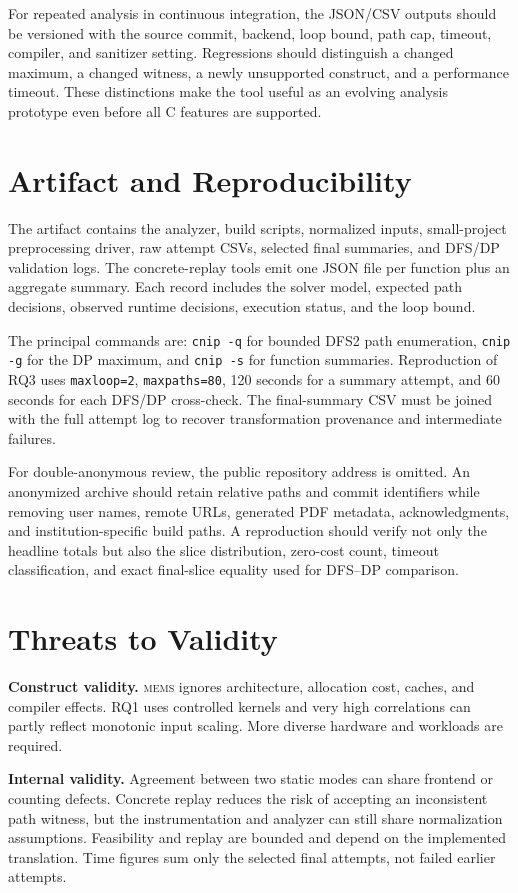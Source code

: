\documentclass[10pt,conference]{IEEEtran}
\newcommand{\mems}{\textsc{mems}\xspace}
\newcommand{\code}[1]{\texttt{#1}}
\begin{document}
For repeated analysis in continuous integration, the JSON/CSV outputs should be versioned with the source commit, backend, loop bound, path cap, timeout, compiler, and sanitizer setting. Regressions should distinguish a changed maximum, a changed witness, a newly unsupported construct, and a performance timeout. These distinctions make the tool useful as an evolving analysis prototype even before all C features are supported.

\section{Artifact and Reproducibility}
The artifact contains the analyzer, build scripts, normalized inputs, small-project preprocessing driver, raw attempt CSVs, selected final summaries, and DFS/DP validation logs. The concrete-replay tools emit one JSON file per function plus an aggregate summary. Each record includes the solver model, expected path decisions, observed runtime decisions, execution status, and the loop bound.

The principal commands are: \code{cnip -q} for bounded DFS2 path enumeration, \code{cnip -g} for the DP maximum, and \code{cnip -s} for function summaries. Reproduction of RQ3 uses \code{maxloop=2}, \code{maxpaths=80}, 120 seconds for a summary attempt, and 60 seconds for each DFS/DP cross-check. The final-summary CSV must be joined with the full attempt log to recover transformation provenance and intermediate failures.

For double-anonymous review, the public repository address is omitted. An anonymized archive should retain relative paths and commit identifiers while removing user names, remote URLs, generated PDF metadata, acknowledgments, and institution-specific build paths. A reproduction should verify not only the headline totals but also the slice distribution, zero-cost count, timeout classification, and exact final-slice equality used for DFS--DP comparison.

\balance
\section{Threats to Validity}
\textbf{Construct validity.} \mems ignores architecture, allocation cost, caches, and compiler effects. RQ1 uses controlled kernels and very high correlations can partly reflect monotonic input scaling. More diverse hardware and workloads are required.

\textbf{Internal validity.} Agreement between two static modes can share frontend or counting defects. Concrete replay reduces the risk of accepting an inconsistent path witness, but the instrumentation and analyzer can still share normalization assumptions. Feasibility and replay are bounded and depend on the implemented translation. Time figures sum only the selected final attempts, not failed earlier attempts.
\end{document}
